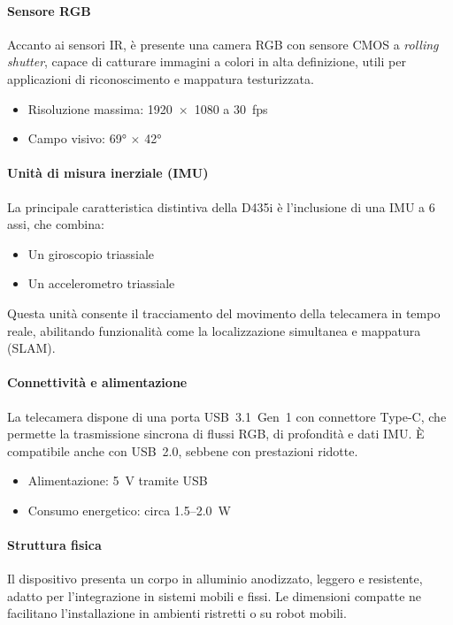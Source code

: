 \documentclass[11pt]{report}
\begin{document}
\paragraph{Sensore RGB}  
Accanto ai sensori IR, è presente una camera RGB con sensore CMOS a \emph{rolling shutter}, capace di catturare immagini a colori in alta definizione, utili per applicazioni di riconoscimento e mappatura testurizzata.

\begin{itemize}
  \item Risoluzione massima: 1920~$\times$~1080 a 30~fps
  \item Campo visivo: 69° $\times$ 42°
\end{itemize}

\paragraph{Unità di misura inerziale (IMU)}  
La principale caratteristica distintiva della D435i è l’inclusione di una IMU a 6 assi, che combina:

\begin{itemize}
  \item Un giroscopio triassiale
  \item Un accelerometro triassiale
\end{itemize}

Questa unità consente il tracciamento del movimento della telecamera in tempo reale, abilitando funzionalità come la localizzazione simultanea e mappatura (SLAM).

\paragraph{Connettività e alimentazione}  
La telecamera dispone di una porta USB~3.1~Gen~1 con connettore Type-C, che permette la trasmissione sincrona di flussi RGB, di profondità e dati IMU. È compatibile anche con USB~2.0, sebbene con prestazioni ridotte.

\begin{itemize}
  \item Alimentazione: 5~V tramite USB
  \item Consumo energetico: circa 1.5–2.0~W
\end{itemize}

\paragraph{Struttura fisica}  
Il dispositivo presenta un corpo in alluminio anodizzato, leggero e resistente, adatto per l'integrazione in sistemi mobili e fissi. Le dimensioni compatte ne facilitano l'installazione in ambienti ristretti o su robot mobili.
\end{document}
